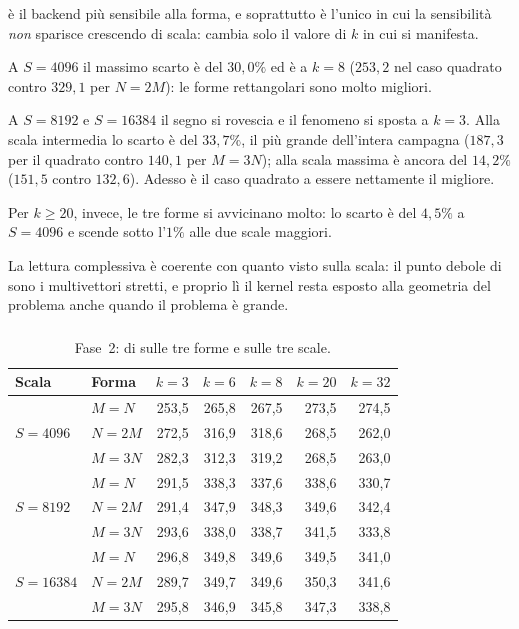 è il backend più sensibile alla forma, e soprattutto
è l'unico in cui la sensibilità \emph{non} sparisce crescendo di scala: cambia
solo il valore di $k$ in cui si manifesta.

A $S=4096$ il massimo scarto è del $30{,}0\%$ ed è a $k=8$ ($253{,}2$ nel caso
quadrato contro $329{,}1$ per $N=2M$): le forme rettangolari sono molto
migliori.

A $S=8192$ e $S=\num{16384}$ il segno si rovescia e il fenomeno si sposta a
$k=3$. Alla scala intermedia lo scarto è del $33{,}7\%$, il più grande
dell'intera campagna ($187{,}3$ per il quadrato contro $140{,}1$ per $M=3N$);
alla scala massima è ancora del $14{,}2\%$ ($151{,}5$ contro $132{,}6$).
Adesso è il caso quadrato a essere nettamente il migliore.

Per $k\ge20$, invece, le tre forme si avvicinano molto: lo scarto è del
$4{,}5\%$ a $S=4096$ e scende sotto l'$1\%$ alle due scale maggiori.

La lettura complessiva è coerente con quanto visto sulla scala: il punto
debole di  sono i multivettori stretti, e proprio lì il
kernel resta esposto alla geometria del problema anche quando il problema è
grande.

\subsubsection{}

\begin{table}[H]
\centering
\footnotesize
\caption{Fase~2:  di  sulle
tre forme e sulle tre scale.}
\label{tab:ris-fase2-smem}
\begin{tabular}{@{}llrrrrr@{}}
\toprule
\textbf{Scala} & \textbf{Forma}
& $k=3$ & $k=6$ & $k=8$ & $k=20$ & $k=32$ \\
\midrule

\multirow{3}{*}{$S=4096$}
& $M=N$  & 253,5 & 265,8 & 267,5 & 273,5 & 274,5 \\
& $N=2M$ & 272,5 & 316,9 & 318,6 & 268,5 & 262,0 \\
& $M=3N$ & 282,3 & 312,3 & 319,2 & 268,5 & 263,0 \\

\midrule

\multirow{3}{*}{$S=8192$}
& $M=N$  & 291,5 & 338,3 & 337,6 & 338,6 & 330,7 \\
& $N=2M$ & 291,4 & 347,9 & 348,3 & 349,6 & 342,4 \\
& $M=3N$ & 293,6 & 338,0 & 338,7 & 341,5 & 333,8 \\

\midrule

\multirow{3}{*}{$S=\num{16384}$}
& $M=N$  & 296,8 & 349,8 & 349,6 & 349,5 & 341,0 \\
& $N=2M$ & 289,7 & 349,7 & 349,6 & 350,3 & 341,6 \\
& $M=3N$ & 295,8 & 346,9 & 345,8 & 347,3 & 338,8 \\

\bottomrule
\end{tabular}
\end{table}

